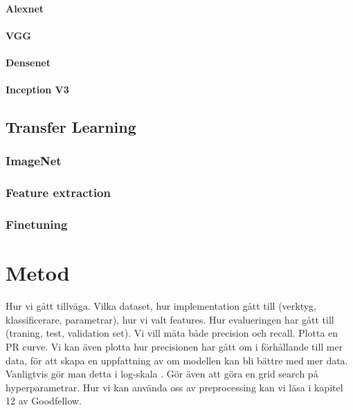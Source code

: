 \documentclass[]{kththesis}
\begin{document}
\subsubsection{Alexnet}

\subsubsection{VGG}

\subsubsection{Densenet}

\subsubsection{Inception V3}

\section{Transfer Learning}

\subsection{ImageNet}

\subsection{Feature extraction}

\subsection{Finetuning}

\chapter{Metod}
Hur vi gått tillväga. Vilka dataset, hur implementation gått till (verktyg, klassificerare, parametrar), hur vi valt features. Hur evalueringen har gått till (traning, test, validation set). Vi vill mäta både precision och recall. Plotta en PR curve. Vi kan även plotta hur precisionen har gått om i förhållande till mer data, för att skapa en uppfattning av om modellen kan bli bättre med mer data. Vanligtvis gör man detta i log-skala \parencite{Goodfellow-et-al-2016}. Gör även att göra en grid search på hyperparametrar. Hur vi kan använda oss av preprocessing kan vi  läsa i kapitel 12 av Goodfellow.
\end{document}
